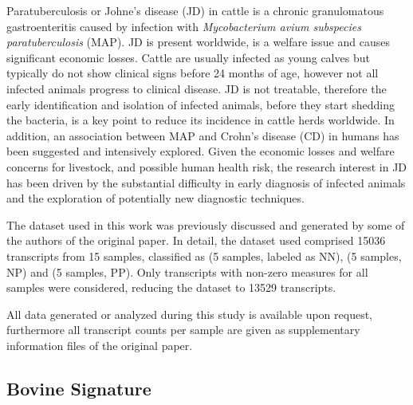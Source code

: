 \documentclass{standalone}
\begin{document}
Paratuberculosis or Johne's disease (JD) in cattle is a chronic granulomatous gastroenteritis caused by infection with \emph{Mycobacterium avium subspecies paratuberculosis} (MAP).
JD is present worldwide, is a welfare issue and causes significant economic losses.
Cattle are usually infected as young calves but typically do not show clinical signs before 24 months of age, however not all infected animals progress to clinical disease.
JD is not treatable, therefore the early identification and isolation of infected animals, before they start shedding the bacteria, is a key point to reduce its incidence in cattle herds worldwide.
In addition, an association between MAP and Crohn's disease (CD) in humans has been suggested and intensively explored.
Given the economic losses and welfare concerns for livestock, and possible human health risk, the research interest in JD has been driven by the substantial difficulty in early diagnosis of infected animals and the exploration of potentially new diagnostic techniques.

The dataset used in this work was previously discussed and generated by some of the authors of the original paper.
In detail, the dataset used comprised 15036 transcripts from 15 samples, classified as  (5 samples, labeled as NN),  (5 samples, NP) and  (5 samples, PP).
Only transcripts with non-zero measures for all samples were considered, reducing the dataset to 13529 transcripts.

All data generated or analyzed during this study is available upon request, furthermore all transcript counts per sample are given as supplementary information files of the original paper.



\subsection[Results]{Bovine Signature}\label{bovine_result}
\end{document}
